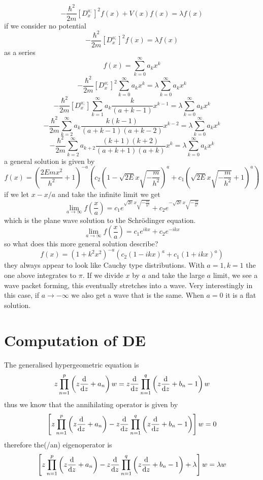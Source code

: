 \documentclass{article}
\begin{document}
$$
-\frac{\hbar^2}{2m} [D^{a;}_x]^2 f(x) + V(x)f(x) = \lambda f(x)
$$
if we consider no potential
$$
-\frac{\hbar^2}{2m} [D^{a;}_x]^2 f(x) = \lambda f(x)
$$
as a series 
$$
f(x) = \sum_{k=0}^\infty a_k x^k
$$
$$
-\frac{\hbar^2}{2m} [D^{a;}_x]^2 \sum_{k=0}^\infty a_k x^k = \lambda \sum_{k=0}^\infty a_k x^k
$$
$$
-\frac{\hbar^2}{2m} [D^{a;}_x] \sum_{k=1}^\infty a_k \frac{k}{(a+k-1)} x^{k-1} = \lambda \sum_{k=0}^\infty a_k x^k
$$
$$
-\frac{\hbar^2}{2m} \sum_{k=2}^\infty a_k \frac{k(k-1)}{(a+k-1)(a+k-2)} x^{k-2} = \lambda \sum_{k=0}^\infty a_k x^k
$$
$$
-\frac{\hbar^2}{2m} \sum_{k=2}^\infty a_{k+2} \frac{(k+1)(k+2)}{(a+k+1)(a+k)} x^{k} = \lambda \sum_{k=0}^\infty a_k x^k
$$
a general solution is given by 
$$
f(x) = \left(\frac{2 E m x^2}{h^2}+1\right)^{-a} \left(c_2 \left(1-\sqrt{2 E} x \sqrt{-\frac{m}{h^2}}\right)^a+c_1 \left(\sqrt{2 E} x \sqrt{-\frac{m}{h^2}}+1\right)^a\right)
$$
if we let $x-x/a$ and take the infinite limit we get 
$$
\lim_{a\to \infty}f\left(\frac{x}{a}\right) = c_1 e^{\sqrt{2 e} x \sqrt{-\frac{m}{h^2}}}+c_2 e^{-\sqrt{2 e} x \sqrt{-\frac{m}{h^2}}}
$$
which is the plane wave solution to the Schrödinger equation. 
$$
\lim_{a\to \infty}f\left(\frac{x}{a}\right) = c_1 e^{i k x}+c_2 e^{- i k x}
$$
so what does this more general solution describe?
$$
f(x) = \left(1 + k^2 x^2\right)^{-a} \left(c_2 \left(1-ikx\right)^a+c_1 \left(1 + i k x \right)^a\right)
$$
they always appear to look like Cauchy type distributions. With $a=1,k=1$ the one above  integrates to $\pi$. If we divide $x$ by $a$ and take the large $a$ limit, we see a wave packet forming, this eventually stretches into a wave. Very interestingly in this case, if $a \to -\infty$ we also get a wave that is the same. When $a=0$ it is a flat solution.

\section{Computation of DE}
The generalised hypergeometric equation is 
$$
z\prod_{n=1}^{p}\left(z\frac{{\rm{d}}}{{\rm{d}}z} + a_n\right)w = z\frac{{\rm{d}}}{{\rm{d}}z}\prod_{n=1}^{q}\left(z\frac{{\rm{d}}}{{\rm{d}}z} + b_n-1\right)w
$$
thus we know that the annihilating operator is given by
$$
\left[z\prod_{n=1}^{p}\left(z\frac{{\rm{d}}}{{\rm{d}}z} + a_n\right) -  z\frac{{\rm{d}}}{{\rm{d}}z}\prod_{n=1}^{q}\left(z\frac{{\rm{d}}}{{\rm{d}}z} + b_n-1\right) \right] w = 0 
$$
therefore the(/an) eigenoperator is
$$
\left[z\prod_{n=1}^{p}\left(z\frac{{\rm{d}}}{{\rm{d}}z} + a_n\right) -  z\frac{{\rm{d}}}{{\rm{d}}z}\prod_{n=1}^{q}\left(z\frac{{\rm{d}}}{{\rm{d}}z} + b_n-1\right) + \lambda \right] w = \lambda w
$$
\end{document}

